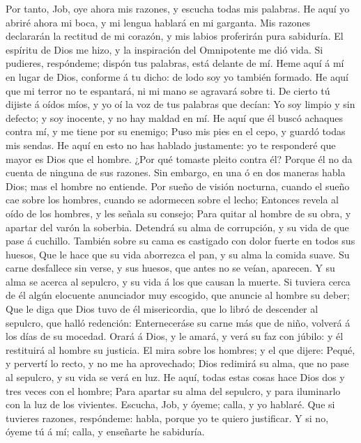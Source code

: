 Por tanto, Job, oye ahora mis razones, y escucha todas mis
palabras.  He aquí yo abriré ahora mi boca, y mi lengua
hablará en mi garganta.  Mis razones declararán la rectitud
de mi corazón, y mis labios proferirán pura sabiduría.  El
espíritu de Dios me hizo, y la inspiración del Omnipotente me dió vida.
 Si pudieres, respóndeme; dispón tus palabras, está delante
de mí.  Heme aquí á mí en lugar de Dios, conforme á tu
dicho: de lodo soy yo también formado.  He aquí que mi
terror no te espantará, ni mi mano se agravará sobre ti.  De
cierto tú dijiste á oídos míos, y yo oí la voz de tus palabras que
decían:  Yo soy limpio y sin defecto; y soy inocente, y no
hay maldad en mí.  He aquí que él buscó achaques contra mí,
y me tiene por su enemigo;  Puso mis pies en el cepo, y
guardó todas mis sendas.  He aquí en esto no has hablado
justamente: yo te responderé que mayor es Dios que el hombre.
 ¿Por qué tomaste pleito contra él? Porque él no da cuenta
de ninguna de sus razones.  Sin embargo, en una ó en dos
maneras habla Dios; mas el hombre no entiende.  Por sueño
de visión nocturna, cuando el sueño cae sobre los hombres, cuando se
adormecen sobre el lecho;  Entonces revela al oído de los
hombres, y les señala su consejo;  Para quitar al hombre de
su obra, y apartar del varón la soberbia.  Detendrá su alma
de corrupción, y su vida de que pase á cuchillo.  También
sobre su cama es castigado con dolor fuerte en todos sus huesos,
 Que le hace que su vida aborrezca el pan, y su alma la
comida suave.  Su carne desfallece sin verse, y sus huesos,
que antes no se veían, aparecen.  Y su alma se acerca al
sepulcro, y su vida á los que causan la muerte.  Si tuviera
cerca de él algún elocuente anunciador muy escogido, que anuncie al
hombre su deber;  Que le diga que Dios tuvo de él
misericordia, que lo libró de descender al sepulcro, que halló
redención:  Enterneceráse su carne más que de niño, volverá
á los días de su mocedad.  Orará á Dios, y le amará, y verá
su faz con júbilo: y él restituirá al hombre su justicia. 
El mira sobre los hombres; y el que dijere: Pequé, y pervertí lo recto,
y no me ha aprovechado;  Dios redimirá su alma, que no pase
al sepulcro, y su vida se verá en luz.  He aquí, todas
estas cosas hace Dios dos y tres veces con el hombre;  Para
apartar su alma del sepulcro, y para iluminarlo con la luz de los
vivientes.  Escucha, Job, y óyeme; calla, y yo hablaré.
 Que si tuvieres razones, respóndeme: habla, porque yo te
quiero justificar.  Y si no, óyeme tú á mí; calla, y
enseñarte he sabiduría.

